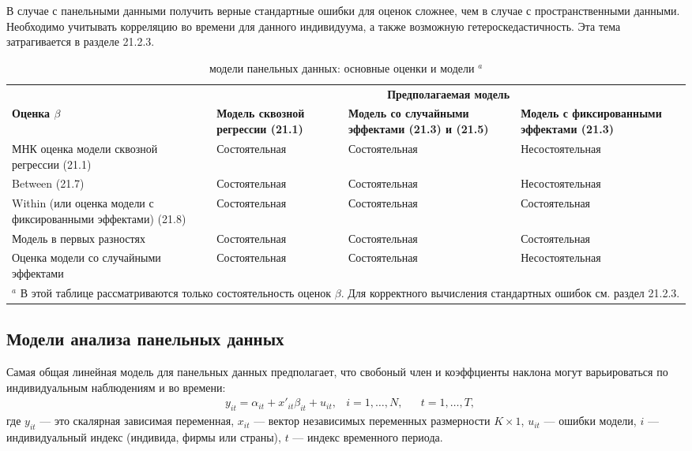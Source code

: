 В случае с панельными данными получить верные стандартные ошибки для оценок сложнее, чем в случае с пространственными данными. Необходимо учитывать корреляцию во времени для данного индивидуума, а также возможную гетероскедастичность. Эта тема затрагивается в разделе 21.2.3.

\begin{table}[ht]
\centering
\caption[]{ модели панельных данных: основные оценки и модели ${}^a$}
\begin{tabular}{p{4cm} p{3.2cm} p{3.2cm} p{3.2cm}}
\hline \hline
				& \multicolumn{3}{c}{\bf{Предполагаемая модель}} \\
\bf{Оценка} $\beta$ 	& \bf{Модель сквозной регрессии (21.1)}	& \bf{Модель со случайными эффектами (21.3)  и (21.5)} &  \bf{Модель с фиксированными эффектами (21.3)} \\
МНК оценка модели сквозной регрессии (21.1)	&	Состоятельная	 &	Состоятельная	&	Несостоятельная	 \\

Between (21.7)	&	Состоятельная	 &	Состоятельная	&	Несостоятельная	 \\
Within (или оценка модели с фиксированными эффектами) (21.8)	&	Состоятельная	 &	Состоятельная	 &	Состоятельная	 \\
Модель в первых разностях & Состоятельная	 &	Состоятельная	 &	Состоятельная	 \\
Оценка модели со случайными эффектами	& Состоятельная	 &	Состоятельная	 &	Несостоятельная	 \\
\hline \hline
\multicolumn{4}{p{15cm}}{${}^a$ В этой таблице рассматриваются только состоятельность оценок $\beta$.  Для корректного вычисления стандартных ошибок см. раздел 21.2.3.}
\end{tabular}
\label{Tab:21.1}
\end{table}

\subsection{Модели анализа панельных данных}

Самая общая линейная модель для панельных данных предполагает, что свобоный член и коэффциенты наклона могут варьироваться по индивидуальным наблюдениям и во времени:
\begin{align}
& y_{it} = \alpha _{it} + x'_{it} \beta_{it}+u_{it},
& i= 1, \dots, N, &
& t=1, \dots, T,
\nonumber
\end{align}
где $y_{it}$ --- это скалярная зависимая переменная, $x_{it}$ --- вектор независимых переменных размерности $K \times 1$, $u_{it}$ --- ошибки модели, $i$ --- индивидуальный индекс (индивида, фирмы или страны), $t$ --- индекс временного периода.

